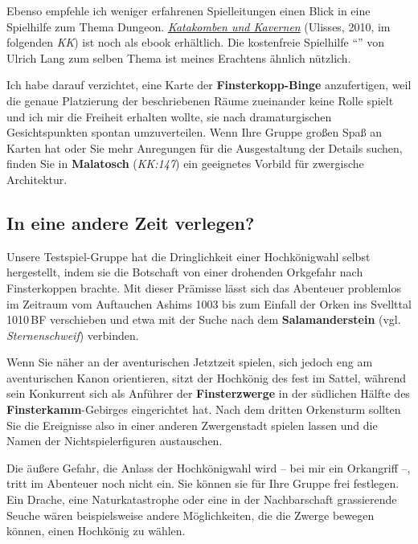 Ebenso empfehle ich weniger erfahrenen Spielleitungen einen Blick in eine Spielhilfe zum Thema Dungeon.
\emph{\href{https://de.wiki-aventurica.de/wiki/Katakomben_und_Kavernen}{Katakomben und Kavernen}} (Ulisses, 2010, im folgenden \emph{KK})
ist noch als ebook erhältlich.
Die kostenfreie Spielhilfe \enquote{} von Ulrich Lang
zum selben Thema ist meines Erachtens ähnlich nützlich.

Ich habe darauf verzichtet, eine Karte der \textbf{Finsterkopp-Binge} anzufertigen, weil die genaue Platzierung der beschriebenen Räume zueinander keine Rolle spielt und ich mir die Freiheit erhalten wollte, sie nach dramaturgischen Gesichtspunkten spontan umzuverteilen. Wenn Ihre Gruppe großen Spaß an Karten hat oder Sie mehr Anregungen für die Ausgestaltung der Details suchen,
finden Sie in \textbf{Malatosch} (\emph{KK:147}) ein geeignetes Vorbild für zwergische Architektur.

\subsection*{In eine andere Zeit verlegen?}
Unsere Testspiel-Gruppe hat die Dringlichkeit einer Hochkönigwahl selbst hergestellt, indem sie die Botschaft von einer drohenden Orkgefahr nach Finsterkoppen brachte.
Mit dieser Prämisse lässt sich das Abenteuer problemlos im Zeitraum vom Auftauchen Ashims 1003 bis zum Einfall der Orken ins Svellttal 1010\,BF verschieben
und etwa mit der Suche nach dem  \textbf{Salamanderstein} (vgl. \emph{Sternenschweif}) verbinden.

Wenn Sie näher an der aventurischen Jetztzeit spielen, sich jedoch eng am aventurischen Kanon orientieren, sitzt der Hochkönig des \fkvs fest im Sattel,
während sein Konkurrent sich als Anführer der \textbf{Finsterzwerge} in der südlichen Hälfte des \textbf{Finsterkamm}-Gebirges eingerichtet hat.
Nach dem dritten Orkensturm sollten Sie die Ereignisse also in einer anderen Zwergenstadt spielen lassen und die Namen der Nichtspielerfiguren austauschen.

Die äußere Gefahr, die Anlass der Hochkönigwahl wird -- bei mir ein Orkangriff --, tritt im Abenteuer noch nicht ein. Sie können sie für Ihre Gruppe frei festlegen.
Ein Drache, eine Naturkatastrophe oder eine in der Nachbarschaft grassierende Seuche wären beispielsweise andere Möglichkeiten, die die Zwerge bewegen können, einen Hochkönig zu wählen.


